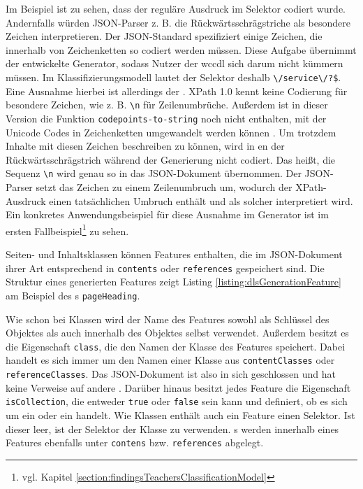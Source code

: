     Im Beispiel ist zu sehen, dass der reguläre Ausdruck im Selektor codiert wurde.
    Andernfalls würden JSON-Parser z. B. die Rückwärtsschrägstriche als besondere Zeichen interpretieren.
    Der JSON-Standard \cite[Kapitel 7]{rfc:8259} spezifiziert einige Zeichen,
    die innerhalb von Zeichenketten so codiert werden müssen.
    Diese Aufgabe übernimmt der entwickelte Generator,
    sodass Nutzer der \gls{wccdl} sich darum nicht kümmern müssen.
    Im Klassifizierungsmodell lautet der Selektor deshalb \verb+\/service\/?$+.
    Eine Ausnahme hierbei ist allerdings der {\xpathSelector}.
    XPath 1.0 kennt keine Codierung für besondere Zeichen,
    wie z. B. \texttt{\textbackslash{n}} für Zeilenumbrüche.
    Außerdem ist in dieser Version die Funktion
    \texttt{codepoints-to-string} noch nicht enthalten,
    mit der Unicode Codes in Zeichenketten umgewandelt werden können
    \cite{w3c:xpath}
    \cite[Kapitel 5.2.1]{w3c:xpathXquery}.
    Um trotzdem Inhalte mit diesen Zeichen beschreiben zu können,
    wird in {\xpathSelector}en der Rückwärtsschrägstrich während der
    Generierung nicht codiert.
    Das heißt, die Sequenz \texttt{\textbackslash{n}} wird genau so in das JSON-Dokument übernommen.
    Der JSON-Parser setzt das Zeichen zu einem Zeilenumbruch um,
    wodurch der XPath-Ausdruck einen tatsächlichen Umbruch enthält
    und als solcher interpretiert wird.
    Ein konkretes Anwendungsbeispiel für diese Ausnahme im Generator
    ist im ersten Fallbeispiel\footnote{vgl. Kapitel \ref{section:findingsTeachersClassificationModel}} zu sehen.

    Seiten- und Inhaltsklassen können Features enthalten,
    die im JSON-Dokument ihrer Art entsprechend in \texttt{contents}
    oder \texttt{references} gespeichert sind.
    Die Struktur eines generierten Features zeigt Listing
    \ref{listing:dlsGenerationFeature} am Beispiel des {\contentFeature}s \texttt{pageHeading}.

    

    Wie schon bei Klassen wird der Name des Features sowohl als Schlüssel des Objektes
    als auch innerhalb des Objektes selbst verwendet.
    Außerdem besitzt es die Eigenschaft \texttt{class},
    die den Namen der Klasse des Features speichert. Dabei handelt es sich immer
    um den Namen einer Klasse aus \texttt{contentClasses} oder \texttt{referenceClasses}.
    Das JSON-Dokument ist also in sich geschlossen und hat keine Verweise auf andere {\resources}.
    Darüber hinaus besitzt jedes Feature die Eigenschaft \texttt{isCollection},
    die entweder \texttt{true} oder \texttt{false} sein kann und definiert,
    ob es sich um ein {\scalarFeature} oder ein {\collectionFeature} handelt.
    Wie Klassen enthält auch ein Feature einen Selektor.
    Ist dieser leer, ist der Selektor der Klasse zu verwenden.
    {\childFeature}s werden innerhalb eines Features ebenfalls unter \texttt{contens} bzw.
    \texttt{references} abgelegt.